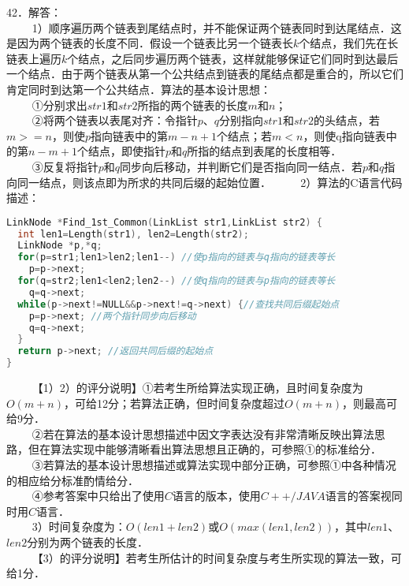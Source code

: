 42．解答：\\
$\qquad$ 1）顺序遍历两个链表到尾结点时，并不能保证两个链表同时到达尾结点．这是因为两个链表的长度不同．假设一个链表比另一个链表长$k$个结点，我们先在长链表上遍历$k$个结点，之后同步遍历两个链表，这样就能够保证它们同时到达最后一个结点．由于两个链表从第一个公共结点到链表的尾结点都是重合的，所以它们肯定同时到达第一个公共结点．算法的基本设计思想：\\
$\qquad$ ①分别求出$str1$和$str2$所指的两个链表的长度$m$和$n$；\\
$\qquad$ ②将两个链表以表尾对齐：令指针$p$、$q$分别指向$str1$和$str2$的头结点，若$m>=n$，则使$p$指向链表中的第$m-n+1$个结点；若$m<n$，则使q指向链表中的第$n-m+1$个结点，即使指针$p$和$q$所指的结点到表尾的长度相等．\\
$\qquad$ ③反复将指针$p$和$q$同步向后移动，并判断它们是否指向同一结点．若$p$和$q$指向同一结点，则该点即为所求的共同后缀的起始位置．
$\qquad$ 2）算法的C语言代码描述：\\
\begin{lstlisting}[language=cpp]
LinkNode *Find_1st_Common(LinkList str1,LinkList str2) {
  int len1=Length(str1), len2=Length(str2);
  LinkNode *p,*q;
  for(p=str1;len1>len2;len1--) //使p指向的链表与q指向的链表等长
    p=p->next;
  for(q=str2;len1<len2;len2--) //使q指向的链表与p指向的链表等长
    q=q->next;
  while(p->next!=NULL&&p->next!=q->next) {//查找共同后缀起始点
    p=p->next; //两个指针同步向后移动
    q=q->next;
  }
  return p->next; //返回共同后缀的起始点
}
\end{lstlisting}
$\qquad$ 【1）2）的评分说明】①若考生所给算法实现正确，且时间复杂度为$O(m+n)$，可给12分；若算法正确，但时间复杂度超过$O(m+n)$，则最高可给9分．\\
$\qquad$ ②若在算法的基本设计思想描述中因文字表达没有非常清晰反映出算法思路，但在算法实现中能够清晰看出算法思想且正确的，可参照①的标准给分．\\
$\qquad$ ③若算法的基本设计思想描述或算法实现中部分正确，可参照①中各种情况的相应给分标准酌情给分．\\
$\qquad$ ④参考答案中只给出了使用$C$语言的版本，使用$C++/JAVA$语言的答案视同时用$C$语言．\\
$\qquad$ 3）时间复杂度为：$O(len1+len2)$或$O(max(len1,len2))$，其中$len1$、$len2$分别为两个链表的长度．\\
$\qquad$ 【3）的评分说明】若考生所估计的时间复杂度与考生所实现的算法一致，可给1分．

